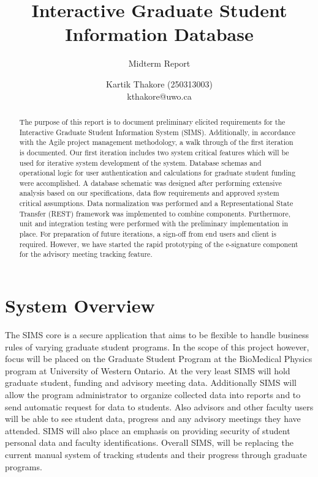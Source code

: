\documentclass{journal}
\begin{document}

\nocite{*}
\title{Interactive Graduate Student Information Database}
\subtitle{Midterm Report} 
\author{Kartik Thakore (250313003)\\kthakore@uwo.ca}
\maketitle

\begin{abstract}
The purpose of this report is to document preliminary elicited requirements for the Interactive Graduate Student Information System (SIMS). Additionally, in accordance with the Agile project management methodology, a walk through of the first iteration is documented. Our first iteration includes two system critical features which will be used for iterative system development of the system. Database schemas and operational logic for user authentication and calculations for graduate student funding were accomplished.  A database schematic was designed after performing extensive analysis based on our specifications, data flow requirements and approved system critical assumptions. Data normalization was performed and a Representational State Transfer (REST) framework was implemented to combine components. Furthermore, unit and integration testing were performed with the preliminary implementation in place. For preparation of future iterations, a sign-off from end users and client is required. However, we have started the rapid prototyping of the e-signature component for the advisory meeting tracking feature. 
\end{abstract}



\section{System Overview}

The SIMS core is a secure application that aims to be flexible to handle business rules of varying graduate student programs. In the scope of this project however, focus will be placed on the Graduate Student Program at the BioMedical Physics program at University of Western Ontario. At the very least SIMS will hold graduate student, funding and advisory meeting data. Additionally SIMS will allow the program administrator to organize collected data into reports and to send automatic request for data to students. Also advisors and other faculty users will be able to see student data, progress and any advisory meetings they have attended. SIMS will also place an emphasis on providing security of student personal data and faculty identifications. Overall SIMS, will be replacing the current manual system of tracking students and their progress through graduate programs.
\end{document}

